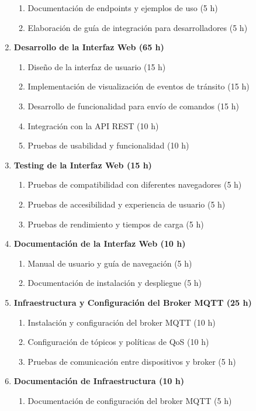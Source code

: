 \documentclass[
11pt, %
]{charter}
\begin{document}
\begin{enumerate}
\begin{enumerate}
\item Documentación de endpoints y ejemplos de uso (5 h)
\item Elaboración de guía de integración para desarrolladores (5 h)
\end{enumerate}
\item \textbf{Desarrollo de la Interfaz Web (65 h)}
\begin{enumerate}
\item Diseño de la interfaz de usuario (15 h)
\item Implementación de visualización de eventos de tránsito (15 h)
\item Desarrollo de funcionalidad para envío de comandos (15 h)
\item Integración con la API REST (10 h)
\item Pruebas de usabilidad y funcionalidad (10 h)
\end{enumerate}
\item \textbf{Testing de la Interfaz Web (15 h)}
\begin{enumerate}
\item Pruebas de compatibilidad con diferentes navegadores (5 h)
\item Pruebas de accesibilidad y experiencia de usuario (5 h)
\item Pruebas de rendimiento y tiempos de carga (5 h)
\end{enumerate}
\item \textbf{Documentación de la Interfaz Web (10 h)}
\begin{enumerate}
\item Manual de usuario y guía de navegación (5 h)
\item Documentación de instalación y despliegue (5 h)
\end{enumerate}
\item \textbf{Infraestructura y Configuración del Broker MQTT (25 h)}
\begin{enumerate}
\item Instalación y configuración del broker MQTT (10 h)
\item Configuración de tópicos y políticas de QoS (10 h)
\item Pruebas de comunicación entre dispositivos y broker (5 h)
\end{enumerate}
\item \textbf{Documentación de Infraestructura (10 h)}
\begin{enumerate}
\item Documentación de configuración del broker MQTT (5 h)

\end{enumerate}
\end{enumerate}
\end{document}
